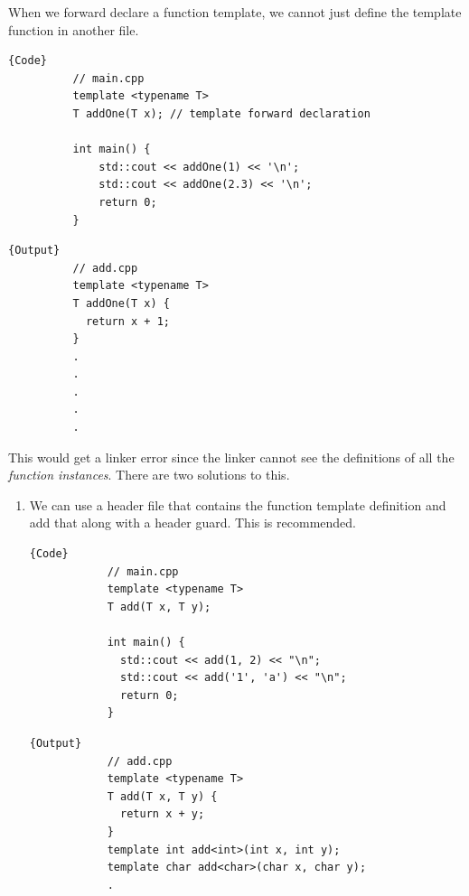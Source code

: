 \documentclass{article}
\newcounter{definition}[section]
\begin{document}
    \begin{lemma}
      \label{thm:function-templates-in-multiple-files}
      When we forward declare a function template, we cannot just define the template function in another file. 

      \noindent\begin{minipage}{.5\textwidth}
        \begin{lstlisting}[]{Code} 
          // main.cpp
          template <typename T>
          T addOne(T x); // template forward declaration

          int main() {
              std::cout << addOne(1) << '\n';
              std::cout << addOne(2.3) << '\n';
              return 0;
          }
        \end{lstlisting}
        \end{minipage}
        \hfill
        \begin{minipage}{.49\textwidth}
        \begin{lstlisting}[]{Output}
          // add.cpp
          template <typename T>
          T addOne(T x) {
            return x + 1;
          }
          .
          .
          .
          .
          .
        \end{lstlisting}
      \end{minipage}

      This would get a linker error since the linker cannot see the definitions of all the \textit{function instances}. There are two solutions to this. 
      \begin{enumerate}
        \item We can use a header file that contains the function template definition and add that along with a header guard. This is recommended. 

        \noindent\begin{minipage}{.45\textwidth}
          \begin{lstlisting}[]{Code}
            // main.cpp
            template <typename T> 
            T add(T x, T y); 

            int main() { 
              std::cout << add(1, 2) << "\n";
              std::cout << add('1', 'a') << "\n";
              return 0; 
            }
          \end{lstlisting}
          \end{minipage}
          \hfill
          \begin{minipage}{.44\textwidth}
          \begin{lstlisting}[]{Output}
            // add.cpp
            template <typename T>
            T add(T x, T y) {
              return x + y;
            }
            template int add<int>(int x, int y);
            template char add<char>(char x, char y);
            .
          \end{lstlisting}
        \end{minipage}


\end{enumerate}
\end{lemma}
\end{document}
